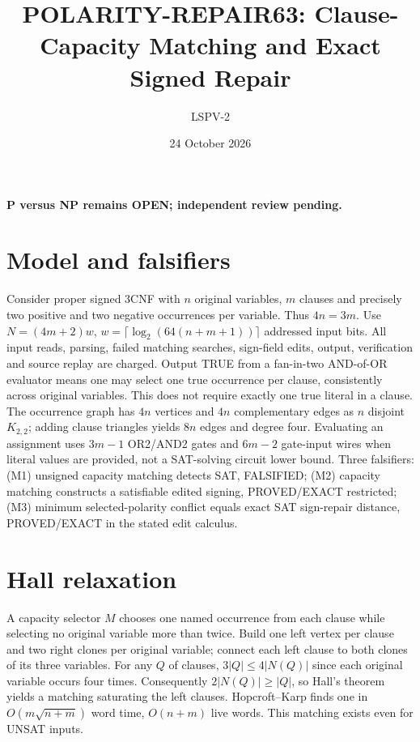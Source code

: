\documentclass[11pt]{article}
\title{POLARITY-REPAIR63: Clause-Capacity Matching and Exact Signed Repair}
\author{LSPV-2}
\date{24 October 2026}
\begin{document}
\maketitle
\begin{center}\textbf{P versus NP remains OPEN; independent review pending.}\end{center}
\section{Model and falsifiers}
Consider proper signed 3CNF with $n$ original variables, $m$ clauses and precisely two positive and two negative occurrences per variable. Thus $4n=3m$. Use $N=(4m+2)w$, $w=\lceil\log_2(64(n+m+1))\rceil$ addressed input bits. All input reads, parsing, failed matching searches, sign-field edits, output, verification and source replay are charged. Output TRUE from a fan-in-two AND-of-OR evaluator means one may select one true occurrence per clause, consistently across original variables. This does not require exactly one true literal in a clause. The occurrence graph has $4n$ vertices and $4n$ complementary edges as $n$ disjoint $K_{2,2}$; adding clause triangles yields $8n$ edges and degree four. Evaluating an assignment uses $3m-1$ OR2/AND2 gates and $6m-2$ gate-input wires when literal values are provided, not a SAT-solving circuit lower bound.
Three falsifiers: (M1) unsigned capacity matching detects SAT, FALSIFIED; (M2) capacity matching constructs a satisfiable edited signing, PROVED/EXACT restricted; (M3) minimum selected-polarity conflict equals exact SAT sign-repair distance, PROVED/EXACT in the stated edit calculus.
\section{Hall relaxation}
A capacity selector $M$ chooses one named occurrence from each clause while selecting no original variable more than twice. Build one left vertex per clause and two right clones per original variable; connect each left clause to both clones of its three variables. For any $Q$ of clauses, $3|Q|\le4|N(Q)|$ since each original variable occurs four times. Consequently $2|N(Q)|\ge|Q|$, so Hall's theorem yields a matching saturating the left clauses. Hopcroft--Karp finds one in $O(m\sqrt{n+m})$ word time, $O(n+m)$ live words. This matching exists even for UNSAT inputs.
\end{document}
